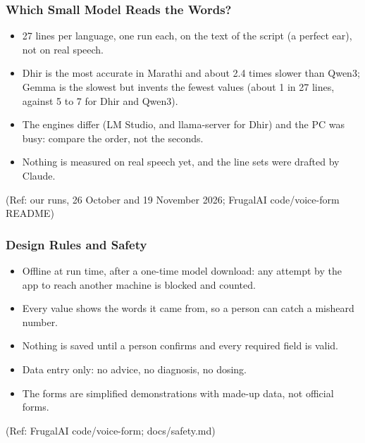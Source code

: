\begin{frame}[fragile]\frametitle{Which Small Model Reads the Words?}
\begin{center}
\scriptsize
{}
\end{center}
\begin{itemize}
\item 27 lines per language, one run each, on the text of the script (a perfect ear), not on real speech.
\item Dhir is the most accurate in Marathi and about 2.4 times slower than Qwen3; Gemma is the slowest but invents the fewest values (about 1 in 27 lines, against 5 to 7 for Dhir and Qwen3).
\item The engines differ (LM Studio, and llama-server for Dhir) and the PC was busy: compare the order, not the seconds.
\item Nothing is measured on real speech yet, and the line sets were drafted by Claude.
\end{itemize}
{\tiny (Ref: our runs, 26 October and 19 November 2026; FrugalAI code/voice-form README)}
\end{frame}

\begin{frame}[fragile]\frametitle{Design Rules and Safety}
\begin{itemize}
\item Offline at run time, after a one-time model download: any attempt by the app to reach another machine is blocked and counted.
\item Every value shows the words it came from, so a person can catch a misheard number.
\item Nothing is saved until a person confirms and every required field is valid.
\item Data entry only: no advice, no diagnosis, no dosing.
\item The forms are simplified demonstrations with made-up data, not official forms.
\end{itemize}
{\tiny (Ref: FrugalAI code/voice-form; docs/safety.md)}
\end{frame}
